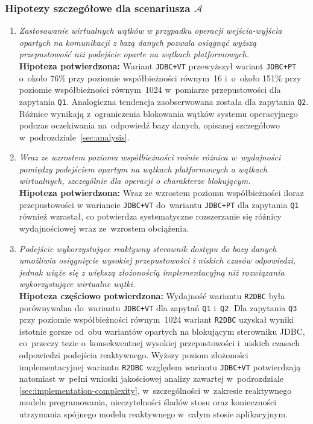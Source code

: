 \subsubsection{Hipotezy szczegółowe dla scenariusza \ensuremath{\mathcal{A}}}
\begin{enumerate}[label=\textbf{H\arabic*.}]
    \itemsep0em

    \item \textit{Zastosowanie wirtualnych wątków w przypadku operacji wejścia-wyjścia opartych na komunikacji z bazą danych pozwala osiągnąć wyższą przepustowość niż podejście oparte na wątkach platformowych.} \\[0.5em] \textbf{Hipoteza potwierdzona:} Wariant \texttt{JDBC+VT} przewyższył wariant \texttt{JDBC+PT} o~około 76\% przy poziomie współbieżności równym~16 i~o~około 151\% przy poziomie współbieżności równym~1024 w~pomiarze przepustowości dla zapytania \texttt{Q1}. Analogiczna tendencja zaobserwowana została dla zapytania \texttt{Q2}. Różnice wynikają z~ograniczenia blokowania wątków systemu operacyjnego podczas oczekiwania na~odpowiedź bazy danych, opisanej szczegółowo w~podrozdziale~\ref{sec:analysis}.

    \item \textit{Wraz ze wzrostem poziomu współbieżności rośnie różnica w~wydajności pomiędzy podejściem opartym na wątkach platformowych a wątkach wirtualnych, szczególnie dla operacji o charakterze blokującym.} \\[0.5em] \textbf{Hipoteza potwierdzona:} Wraz ze wzrostem poziomu współbieżności iloraz przepustowości w wariancie \texttt{JDBC+VT} do~wariantu \texttt{JDBC+PT} dla zapytania \texttt{Q1} również wzrastał, co potwierdza systematyczne rozszerzanie się różnicy wydajnościowej wraz ze~wzrostem obciążenia.

    \item \textit{Podejście wykorzystujące reaktywny sterownik dostępu do bazy danych umożliwia osiągnięcie wysokiej przepustowości i niskich czasów odpowiedzi, jednak wiąże się z większą złożonością implementacyjną niż rozwiązania wykorzystujące wirtualne wątki.} \\[2em] \textbf{Hipoteza częściowo potwierdzona:} Wydajność wariantu \texttt{R2DBC} była porównywalna do~wariantu \texttt{JDBC+VT} dla zapytań \texttt{Q1} i~\texttt{Q2}. Dla zapytania \texttt{Q3} przy poziomie współbieżności równym~1024 wariant \texttt{R2DBC} uzyskał wyniki istotnie gorsze od~obu wariantów opartych na blokującym sterowniku JDBC, co~przeczy tezie o~konsekwentnej wysokiej przepustowości i~niskich czasach odpowiedzi podejścia reaktywnego. Wyższy poziom złożoności implementacyjnej wariantu \texttt{R2DBC} względem wariantu \texttt{JDBC+VT} potwierdzają natomiast w~pełni wnioski jakościowej analizy zawartej w~podrozdziale \ref{sec:implementation-complexity}, w~szczególności w~zakresie reaktywnego modelu programowania, nieczytelności śladów stosu oraz konieczności utrzymania spójnego modelu reaktywnego w~całym stosie aplikacyjnym.


\end{enumerate}
